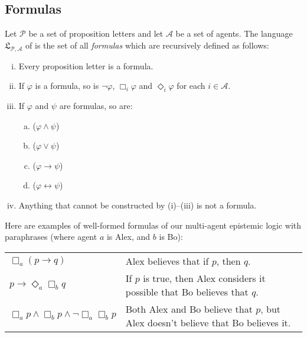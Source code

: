 \documentclass[nobib,nofonts]{tufte-handout}
\newcommand{\mygray}[1]{\textcolor{mygray2}{#1}}
\newcommand{\modlog}{\acro{ModLog}}
\begin{document}
\subsection{Formulas}

Let $\mathcal{P}$ be a set of proposition letters and let $\mathcal{A}$ be a set of agents.
The language $\mathfrak{L}_{\mathcal{P},\mathcal{A}}$ of \modlog is the set of all \emph{formulas} which are recursively defined as follows:
\begin{enumerate}[(i)]
  \item Every proposition letter is a formula.
  \item If $\varphi$ is a formula, so is $\neg \varphi$, $\Box_{i} \varphi$ and $\Diamond_{i} \varphi$ for each $i \in \mathcal{A}$.
  \item If $\varphi$ and $\psi$ are formulas, so are:
        \vspace*{-0.4cm}
        \begin{multicols}{4}
          \begin{enumerate}[a.]
            \item ($\varphi \wedge \psi$)
            \item ($\varphi \vee \psi$)
            \item ($\varphi \rightarrow \psi$)
            \item ($\varphi \leftrightarrow \psi$)
          \end{enumerate}
        \end{multicols}
        \vspace*{-0.4cm}
  \item Anything that cannot be constructed by (i)--(iii) is not a formula.
\end{enumerate}


Here are examples of well-formed formulas of our multi-agent epistemic logic with paraphrases (where agent $a$ is Alex, and $b$ is Bo):
\begin{center}
  \begin{tabular}{lp{7cm}}
    \vspace{0.3cm}
    $\Box_{a} (p \rightarrow q)$
    & \mygray{Alex believes that if $p$, then $q$.}
    \\
    \vspace{0.3cm}
    $p \rightarrow \Diamond_{a} \Box_{b} q$
    & \mygray{If $p$ is true, then Alex considers it possible that Bo believes that $q$.}
    \\
    $\Box_{a} p \wedge \Box_{b} p \wedge \neg \Box_{a} \Box_{b} p$
    & \mygray{Both Alex and Bo believe that $p$, but Alex doesn't believe that Bo believes it.}

  \end{tabular}
\end{center}
\end{document}
